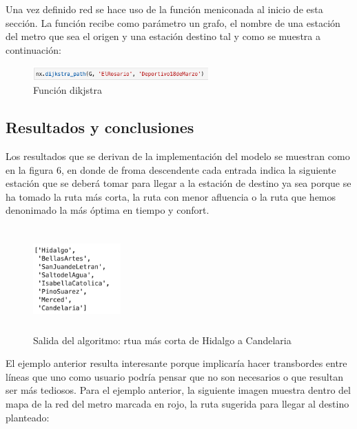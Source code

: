 \documentclass[
]{article}
\begin{document}
Una vez definido red se hace uso de la función meniconada al inicio de
esta sección. La función recibe como parámetro un grafo, el nombre de
una estación del metro que sea el origen y una estación destino tal y
como se muestra a continuación:

\begin{figure}
\centering
\includegraphics[width=0.6\textwidth,height=\textheight]{Imagenes/dijkstra_function.png}
\caption{Función dikjstra}
\end{figure}

\hypertarget{resultados-y-conclusiones}{%
\subsection{Resultados y conclusiones}\label{resultados-y-conclusiones}}

Los resultados que se derivan de la implementación del modelo se
muestran como en la figura 6, en donde de froma descendente cada entrada
indica la siguiente estación que se deberá tomar para llegar a la
estación de destino ya sea porque se ha tomado la ruta más corta, la
ruta con menor afluencia o la ruta que hemos denonimado la más óptima en
tiempo y confort.

\begin{figure}
\centering
\includegraphics[width=0.3\textwidth,height=1.5625in]{Imagenes/Ejemplo_salida.png}
\caption{Salida del algoritmo: rtua más corta de Hidalgo a Candelaria}
\end{figure}

El ejemplo anterior resulta interesante porque implicaría hacer
transbordes entre líneas que uno como usuario podría pensar que no son
necesarios o que resultan ser más tediosos. Para el ejemplo anterior, la
siguiente imagen muestra dentro del mapa de la red del metro marcada en
rojo, la ruta sugerida para llegar al destino planteado:
\end{document}
